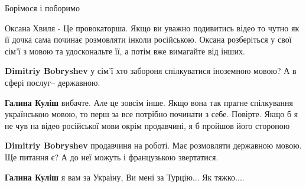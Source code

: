 \begin{itemize}
Борімося і поборимо

 
Оксана Хвиля - Це провокаторша. Якщо ви уважно подивитись відео то чутно як її
дочка сама починає розмовляти інколи російською. Оксана розберіться у свої
сім'ї з мовою та удоскональте її, а потім вже вимагайте від інших.

\begin{itemize}
 
\textbf{Dimitriy Bobryshev} у сім'ї хто забороня спілкуватися іноземною мовою? А в сфері послуг-- державною.

 
\textbf{Галина Куліш} вибачте. Але це зовсім інше. Якщо вона так прагне спілкування українською мовою, то перш за все потрібно починати з себе. Повірте. Якщо б я не чув на відео російської мови окрім продавчині, я б пройшов його стороною

 
\textbf{Dimitriy Bobryshev} продавчиня на роботі. Має розмовляти державною мовою. Ще питання є? А до неї можуть і французькою звертатися.

 
\textbf{Галина Куліш} я вам за Україну, Ви мені за Турцію... Як тяжко....


\end{itemize}
\end{itemize}
